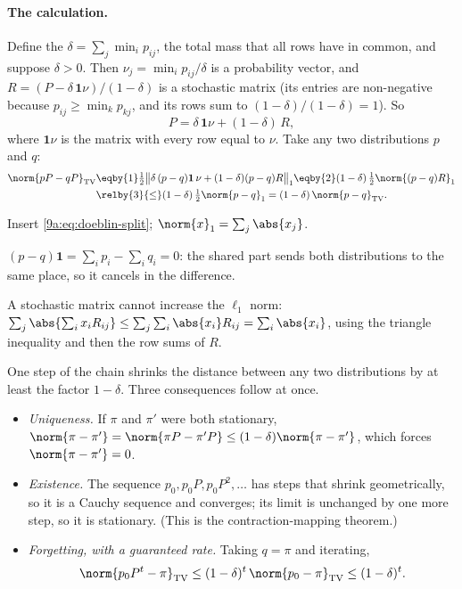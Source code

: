 \paragraph{The calculation.} Define the 
$\delta=\sum_j\min_ip_{ij}$, the total mass that all rows have in common, and suppose
$\delta>0$. Then $\nu_j=\min_ip_{ij}/\delta$ is a probability vector, and
$R=(P-\delta\,\mathbf1\nu)/(1-\delta)$ is a stochastic matrix (its entries are non-negative
because $p_{ij}\ge\min_kp_{kj}$, and its rows sum to $(1-\delta)/(1-\delta)=1$). So
\begin{equation}
  P=\delta\,\mathbf1\nu+(1-\delta)\,R,
  \label{9a:eq:doeblin-split}
\end{equation}
where $\mathbf1\nu$ is the matrix with every row equal to $\nu$. Take any two distributions $p$
and $q$:
\begin{align}
  \norm{pP-qP}_{\rm TV}
  &\eqby{1}\tfrac12\bigl\lVert\delta\,(p-q)\mathbf1\,\nu+(1-\delta)(p-q)R\bigr\rVert_1
   \eqby{2}(1-\delta)\,\tfrac12\norm{(p-q)R}_1 \nonumber\\
  &\relby{3}{\le}(1-\delta)\,\tfrac12\norm{p-q}_1
   =(1-\delta)\,\norm{p-q}_{\rm TV} .
  \label{9a:eq:contraction}
\end{align}
\begin{explain}
  \item Insert \eqref{9a:eq:doeblin-split}; $\norm{x}_1=\sum_j\abs{x_j}$.
  \item $(p-q)\mathbf1=\sum_ip_i-\sum_iq_i=0$: the shared part sends both distributions to the
        same place, so it cancels in the difference.
  \item A stochastic matrix cannot increase the $\ell_1$ norm:
        $\sum_j\abs{\sum_ix_iR_{ij}}\le\sum_j\sum_i\abs{x_i}R_{ij}=\sum_i\abs{x_i}$, using the
        triangle inequality and then the row sums of $R$.
\end{explain}
One step of the chain shrinks the distance between any two distributions by at least the factor
$1-\delta$. Three consequences follow at once.
\begin{itemize}[itemsep=1pt]
  \item \emph{Uniqueness.} If $\pi$ and $\pi'$ were both stationary,
        $\norm{\pi-\pi'}=\norm{\pi P-\pi'P}\le(1-\delta)\norm{\pi-\pi'}$, which forces
        $\norm{\pi-\pi'}=0$.
  \item \emph{Existence.} The sequence $p_0,p_0P,p_0P^2,\dots$ has steps that shrink
        geometrically, so it is a Cauchy sequence and converges; its limit is unchanged by one
        more step, so it is stationary. (This is the contraction-mapping theorem.)
  \item \emph{Forgetting, with a guaranteed rate.} Taking $q=\pi$ and iterating,
        \begin{equation}
          \norm{p_0P^t-\pi}_{\rm TV}\le(1-\delta)^t\,\norm{p_0-\pi}_{\rm TV}\le(1-\delta)^t .
          \label{9a:eq:doeblin-bound}
        \end{equation}
\end{itemize}

